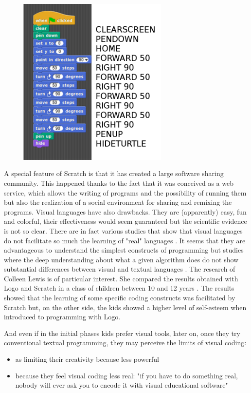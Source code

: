 \begin{figure}
   \centering
   \includegraphics[width=7.5cm]{./images/librelogo/scratch-2.png}
   \label{scratch}
\end{figure}

A special feature of Scratch is that it has created a large software sharing community. This happened thanks to the fact that it was conceived as a web service, which allows the writing of programs and the possibility of running them but also the realization of a social environment for sharing and remixing the programs. Visual languages have also drawbacks. They are (apparently) easy, fun and colorful, their effectiveness would seem guaranteed but the scientific evidence is not so clear. There are in fact various studies that show that visual languages do not facilitate so much the learning of "real" languages \cite{Weintrop}. It seems that they are advantageous to understand the simplest constructs of programming but studies where the deep understanding about what a given algorithm does do not show substantial differences between visual and textual languages \cite{Weintrop2}. The research of Colleen Lewis is of particular interest. She compared the results obtained with Logo and Scratch in a class of children between 10 and 12 years \cite{Lewis}. The results showed that the learning of some specific coding constructs was facilitated by Scratch but, on the other side, the kids showed a higher level of self-esteem when introduced to programming with Logo.    

And even if in the initial phases kids prefer visual tools, later on, once they try conventional textual programming, they may perceive the limits of visual coding:

\begin{itemize}
\item as limiting their creativity because less powerful
\item because they feel visual coding less real: "if you have to do something real, nobody will ever ask you to encode it with visual educational software" \cite{Weintrop3}
\end{itemize}

